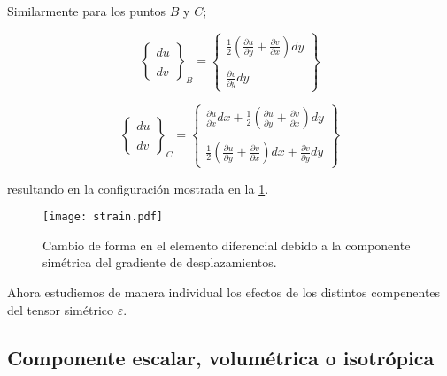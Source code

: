 \documentclass[../notas medios.tex]{subfiles}
\begin{document}
Similarmente para los puntos $B$ y $C$;

\[{\left\{ {\begin{array}{*{20}{c}}
{du}\\\\
{dv}
\end{array}} \right\}_B} = \left\{ {\begin{array}{*{20}{c}}
{\frac{1}{2}\left( {\frac{{\partial u}}{{\partial y}} + \frac{{\partial v}}{{\partial x}}} \right)dy}\\\\
{\frac{{\partial v}}{{\partial y}}dy}
\end{array}} \right\}\]

\[{\left\{ {\begin{array}{*{20}{c}}
{du}\\\\
{dv}
\end{array}} \right\}_C} = \left\{ {\begin{array}{*{20}{c}}
{\frac{{\partial u}}{{\partial x}}dx + \frac{1}{2}\left( {\frac{{\partial u}}{{\partial y}} + \frac{{\partial v}}{{\partial x}}} \right)dy}\\\\
{\frac{1}{2}\left( {\frac{{\partial u}}{{\partial y}} + \frac{{\partial v}}{{\partial x}}} \right)dx + \frac{{\partial v}}{{\partial y}}dy}
\end{array}} \right\}\]

resultando en la configuración mostrada en la \cref{strain}.


\begin{figure}[H]
\centering
	\texttt{[image: strain.pdf]}
	\caption{Cambio de forma en el elemento diferencial debido a la componente simétrica del gradiente de desplazamientos.}
	\label{strain}
\end{figure}

Ahora estudiemos de manera individual los efectos de los distintos compenentes del tensor simétrico $\varepsilon$.
\subsection{Componente escalar, volumétrica o isotrópica}
\end{document}
